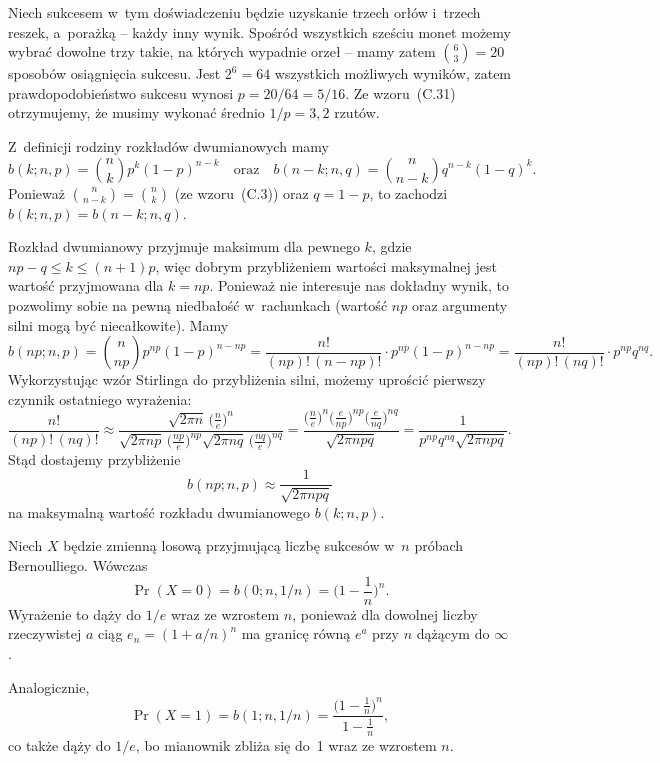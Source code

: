 \exercise %
Niech sukcesem w~tym doświadczeniu będzie uzyskanie trzech orłów i~trzech reszek, a~porażką -- każdy inny wynik. Spośród wszystkich sześciu monet możemy wybrać dowolne trzy takie, na których wypadnie orzeł -- mamy zatem $\binom{6}{3}=20$ sposobów osiągnięcia sukcesu. Jest $2^6=64$ wszystkich możliwych wyników, zatem prawdopodobieństwo sukcesu wynosi $p=20/64=5/16$. Ze wzoru~(C.31) otrzymujemy, że musimy wykonać średnio $1/p=3{,}2$ rzutów.

\exercise %
Z~definicji rodziny rozkładów dwumianowych mamy
\[
	b(k;n,p) = \binom{n}{k}p^k(1-p)^{n-k} \quad\text{oraz}\quad b(n-k;n,q) = \binom{n}{n-k}q^{n-k}(1-q)^k.
\]
Ponieważ $\binom{n}{n-k}=\binom{n}{k}$ (ze wzoru~(C.3)) oraz $q=1-p$, to zachodzi $b(k;n,p)=b(n-k;n,q)$.

\exercise %
Rozkład dwumianowy przyjmuje maksimum dla pewnego $k$, gdzie $np-q\le k\le(n+1)p$, więc dobrym przybliżeniem wartości maksymalnej jest wartość przyjmowana dla $k=np$. Ponieważ nie interesuje nas dokładny wynik, to pozwolimy sobie na pewną niedbałość w~rachunkach (wartość $np$ oraz argumenty silni mogą być niecałkowite). Mamy
\[
	b(np;n,p) = \binom{n}{np}p^{np}(1-p)^{n-np} = \frac{n!}{(np)!\,(n-np)!}\cdot p^{np}(1-p)^{n-np} = \frac{n!}{(np)!\,(nq)!}\cdot p^{np}q^{nq}.
\]
Wykorzystując wzór Stirlinga do przybliżenia silni, możemy uprościć pierwszy czynnik ostatniego wyrażenia:
\[
	\frac{n!}{(np)!\,(nq)!} \approx \frac{\sqrt{2\pi n}\,\bigl(\frac{n}{e}\bigr)^n}{\sqrt{2\pi np}\,\bigl(\frac{np}{e}\bigr)^{np}\sqrt{2\pi nq}\,\bigl(\frac{nq}{e}\bigr)^{nq}} = \frac{\bigl(\frac{n}{e}\bigr)^n\bigl(\frac{e}{np}\bigr)^{np}\bigl(\frac{e}{nq}\bigr)^{nq}}{\sqrt{2\pi npq}} = \frac{1}{p^{np}q^{nq}\sqrt{2\pi npq}}.
\]
Stąd dostajemy przybliżenie
\[
	b(np;n,p) \approx \frac{1}{\sqrt{2\pi npq}}
\]
na maksymalną wartość rozkładu dwumianowego $b(k;n,p)$.

\exercise %
Niech $X$ będzie zmienną losową przyjmującą liczbę sukcesów w~$n$ próbach Bernoulliego. Wówczas
\[
	\Pr(X=0) = b(0;n,1/n) = \biggl(1-\frac{1}{n}\biggr)^n.
\]
Wyrażenie to dąży do $1/e$ wraz ze wzrostem $n$, ponieważ dla dowolnej liczby rzeczywistej $a$ ciąg $e_n={(1+a/n)}^n$ ma granicę równą $e^a$ przy $n$ dążącym do $\infty$.

Analogicznie,
\[
	\Pr(X=1) = b(1;n,1/n) = \frac{\bigl(1-\frac{1}{n}\bigr)^n}{1-\frac{1}{n}},
\]
co także dąży do $1/e$, bo mianownik zbliża się do~1 wraz ze wzrostem $n$.

